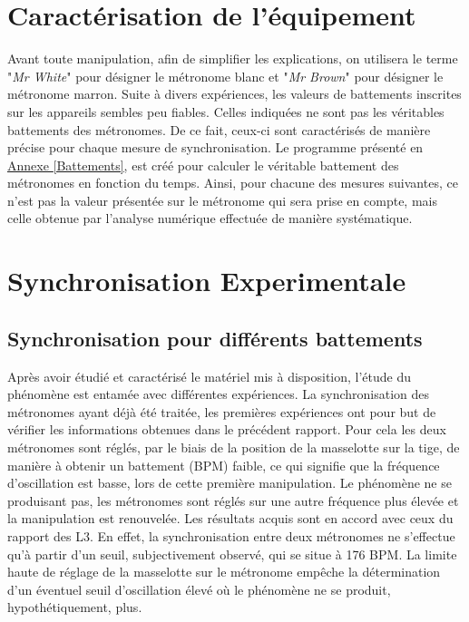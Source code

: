 \documentclass[a4paper,11pt]{report}
\begin{document}
\section{Caractérisation de l'équipement}
Avant toute manipulation, afin de simplifier les explications, on utilisera le terme "{\it Mr White}" pour désigner le métronome blanc et "{\it Mr Brown}" pour désigner le métronome marron. Suite à divers expériences, les valeurs de battements inscrites sur les appareils sembles peu fiables. Celles indiquées ne sont pas les véritables battements des métronomes. De ce fait, ceux-ci sont caractérisés de manière précise pour chaque mesure de synchronisation. Le programme présenté en \underline{Annexe \ref{Battements}}, est créé pour calculer le véritable battement des métronomes en fonction du temps. Ainsi, pour chacune des mesures suivantes, ce n'est pas la valeur présentée sur le métronome qui sera prise en compte, mais celle obtenue par l'analyse numérique effectuée de manière systématique.

\section{Synchronisation Experimentale}

\subsection{Synchronisation pour différents battements}
Après avoir étudié et caractérisé le matériel mis à disposition, l'étude du phénomène est entamée avec différentes expériences. La synchronisation des métronomes ayant déjà été traitée, les premières expériences ont pour but de vérifier les informations obtenues dans le précédent rapport. Pour cela les deux métronomes sont réglés, par le biais de la position de la masselotte sur la tige, de manière à obtenir un battement (BPM) faible, ce qui signifie que la fréquence d'oscillation est basse, lors de cette première manipulation. Le phénomène ne se produisant pas, les métronomes sont réglés sur une autre fréquence plus élevée et la manipulation est renouvelée. Les résultats acquis sont en accord avec ceux du rapport des L3\cite{ram}. En effet, la synchronisation entre deux métronomes ne s'effectue qu'à partir d'un seuil, subjectivement observé, qui se situe à 176 BPM. La limite haute de réglage de la masselotte sur le métronome empêche la détermination d'un éventuel seuil d'oscillation élevé où le phénomène ne se produit, hypothétiquement, plus.\\
\end{document}
